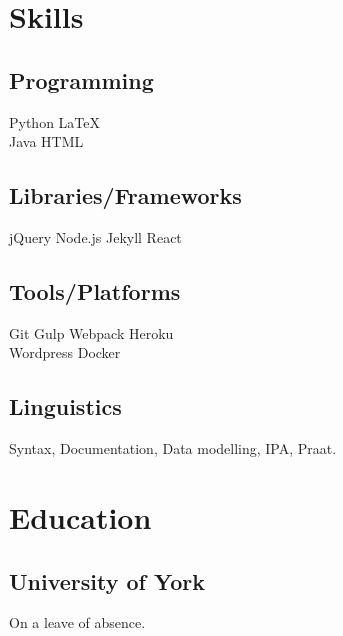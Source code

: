 \documentclass[]{plushcv}
\begin{document}
\begin{minipage}[t]{0.25\textwidth} 


\section{Skills}
\subsection{Programming}
\sectionsep
{}
Python \textbullet{} LaTeX  \\
\sectionsep
{}
Java \textbullet{}  HTML \\
\sectionsep
\sectionsep
\subsection{Libraries/Frameworks}
\sectionsep
jQuery \textbullet{} Node.js \textbullet{} Jekyll \textbullet{} React \\
\sectionsep
\sectionsep
\subsection{Tools/Platforms}
\sectionsep
Git \textbullet{} Gulp \textbullet{} Webpack \textbullet{} Heroku    \\ Wordpress \textbullet{} Docker \\
\sectionsep
\sectionsep
\subsection{Linguistics}
\sectionsep
Syntax, Documentation, Data modelling, IPA, Praat.
\sectionsep


\section{Education} 

\subsection{University of York}
On a leave of absence.

\sectionsep


\end{minipage}
\end{document}
